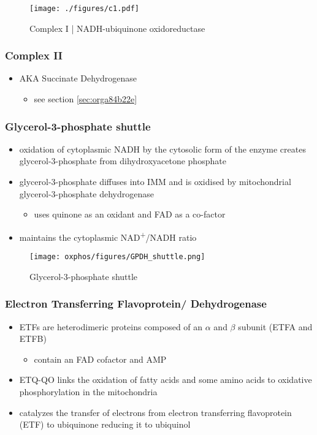 \documentclass[12pt]{scrartcl}
\begin{document}
\begin{figure}[htbp]
\centering
\texttt{[image: ./figures/c1.pdf]}
\caption[c1]{\label{fig:org7579214}Complex I | NADH-ubiquinone oxidoreductase}
\end{figure}

\subsubsection{Complex II}
\label{sec:orgec21706}
\begin{itemize}
\item AKA Succinate Dehydrogenase 
\begin{itemize}
\item see section \ref{sec:orga84b22e}
\end{itemize}
\end{itemize}

\subsubsection{Glycerol-3-phosphate shuttle}
\label{sec:org968a713}
\begin{itemize}
\item oxidation of cytoplasmic NADH by the cytosolic form of the enzyme
creates glycerol-3-phosphate from dihydroxyacetone phosphate
\item glycerol-3-phosphate diffuses into IMM and is oxidised by mitochondrial glycerol-3-phosphate dehydrogenase
\begin{itemize}
\item uses quinone as an oxidant and FAD as a co-factor
\end{itemize}
\item maintains the cytoplasmic NAD\textsuperscript{+}/NADH ratio
\end{itemize}

\begin{figure}[htbp]
\centering
\texttt{[image: oxphos/figures/GPDH\_shuttle.png]}
\caption[g3ps]{\label{fig:org5bac8d0}Glycerol-3-phosphate shuttle}
\end{figure}

\subsubsection{Electron Transferring Flavoprotein/ Dehydrogenase}
\label{sec:org872a606}
\begin{itemize}
\item ETFs are heterodimeric proteins composed of an \(\alpha\) and \(\beta\)
subunit (ETFA and ETFB)
\begin{itemize}
\item contain an FAD cofactor and AMP
\end{itemize}
\item ETQ-QO links the oxidation of fatty acids and some amino acids to
oxidative phosphorylation in the mitochondria
\item catalyzes the transfer of electrons from electron transferring
flavoprotein (ETF) to ubiquinone reducing it to ubiquinol
\end{itemize}
\end{document}
